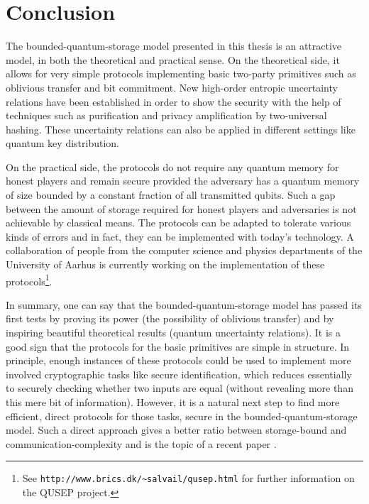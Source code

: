 \section{Conclusion} \label{sec:conclusion}
The bounded-quantum-storage model
presented in this thesis is an attractive model, in both the
theoretical and practical sense. On the theoretical side, it allows
for very simple protocols implementing basic two-party primitives such
as oblivious transfer and bit commitment. New high-order entropic
uncertainty relations
 have been established in order to show the
security with the help of techniques such as purification and privacy
amplification by two-universal hashing. These uncertainty
relations can also be applied in different settings like quantum key
distribution.

On the practical side, the protocols do not require any quantum memory
for honest players and remain secure provided the adversary has a
quantum memory of size bounded by a constant fraction of all
transmitted qubits.  Such a gap between the amount of storage required
for honest players and adversaries is not achievable by classical
means.  The protocols can be adapted to tolerate various kinds of
errors and in fact, they can be implemented with today's technology. A
collaboration of people from the computer science and physics
departments of the University of Aarhus is currently working on the
implementation of these protocols\footnote{See
\texttt{http://www.brics.dk/{\textasciitilde}salvail/qusep.html}
for further information on the QUSEP project.}.

In summary, one can say that the bounded-quantum-storage model has
passed its first tests by proving its power (the possibility of
oblivious transfer) and by inspiring beautiful theoretical results
(quantum uncertainty relations). It is a good sign that the protocols
for the basic primitives are simple in structure. In principle, enough
instances of these protocols could be used to implement more involved
cryptographic tasks like secure identification, which reduces
essentially to securely checking whether two inputs are equal (without
revealing more than this mere bit of information). However, it is a
natural next step to find more efficient, direct protocols for those
tasks, secure in the bounded-quantum-storage model. Such a direct
approach gives a better ratio between storage-bound and
communication-complexity and is the topic of a recent paper
\cite{DFSS07}.


